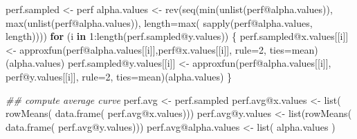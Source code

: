 \documentclass[
  letterpaper,
  DIV=11,
  numbers=noendperiod]{scrartcl}
\newenvironment{Shaded}{\begin{snugshade}}{\end{snugshade}}
\newcommand{\AttributeTok}[1]{\textcolor[rgb]{0.40,0.45,0.13}{#1}}
\newcommand{\ControlFlowTok}[1]{\textcolor[rgb]{0.00,0.23,0.31}{\textbf{#1}}}
\newcommand{\DecValTok}[1]{\textcolor[rgb]{0.68,0.00,0.00}{#1}}
\newcommand{\DocumentationTok}[1]{\textcolor[rgb]{0.37,0.37,0.37}{\textit{#1}}}
\newcommand{\FunctionTok}[1]{\textcolor[rgb]{0.28,0.35,0.67}{#1}}
\newcommand{\NormalTok}[1]{\textcolor[rgb]{0.00,0.23,0.31}{#1}}
\newcommand{\OtherTok}[1]{\textcolor[rgb]{0.00,0.23,0.31}{#1}}
\newcommand{\SpecialCharTok}[1]{\textcolor[rgb]{0.37,0.37,0.37}{#1}}
\begin{document}
\begin{Shaded}
\begin{Highlighting}[]
\NormalTok{    perf.sampled }\OtherTok{\textless{}{-}}\NormalTok{ perf}
\NormalTok{    alpha.values }\OtherTok{\textless{}{-}} \FunctionTok{rev}\NormalTok{(}\FunctionTok{seq}\NormalTok{(}\FunctionTok{min}\NormalTok{(}\FunctionTok{unlist}\NormalTok{(perf}\SpecialCharTok{@}\NormalTok{alpha.values)),}
                            \FunctionTok{max}\NormalTok{(}\FunctionTok{unlist}\NormalTok{(perf}\SpecialCharTok{@}\NormalTok{alpha.values)),}
                            \AttributeTok{length=}\FunctionTok{max}\NormalTok{( }\FunctionTok{sapply}\NormalTok{(perf}\SpecialCharTok{@}\NormalTok{alpha.values, length))))}
    \ControlFlowTok{for}\NormalTok{ (i }\ControlFlowTok{in} \DecValTok{1}\SpecialCharTok{:}\FunctionTok{length}\NormalTok{(perf.sampled}\SpecialCharTok{@}\NormalTok{y.values)) \{}
\NormalTok{        perf.sampled}\SpecialCharTok{@}\NormalTok{x.values[[i]] }\OtherTok{\textless{}{-}}
          \FunctionTok{approxfun}\NormalTok{(perf}\SpecialCharTok{@}\NormalTok{alpha.values[[i]],perf}\SpecialCharTok{@}\NormalTok{x.values[[i]],}
                    \AttributeTok{rule=}\DecValTok{2}\NormalTok{, }\AttributeTok{ties=}\NormalTok{mean)(alpha.values)}
\NormalTok{        perf.sampled}\SpecialCharTok{@}\NormalTok{y.values[[i]] }\OtherTok{\textless{}{-}}
          \FunctionTok{approxfun}\NormalTok{(perf}\SpecialCharTok{@}\NormalTok{alpha.values[[i]], perf}\SpecialCharTok{@}\NormalTok{y.values[[i]],}
                    \AttributeTok{rule=}\DecValTok{2}\NormalTok{, }\AttributeTok{ties=}\NormalTok{mean)(alpha.values)}
\NormalTok{    \}}

    \DocumentationTok{\#\# compute average curve}
\NormalTok{    perf.avg }\OtherTok{\textless{}{-}}\NormalTok{ perf.sampled}
\NormalTok{    perf.avg}\SpecialCharTok{@}\NormalTok{x.values }\OtherTok{\textless{}{-}} \FunctionTok{list}\NormalTok{( }\FunctionTok{rowMeans}\NormalTok{( }\FunctionTok{data.frame}\NormalTok{( perf.avg}\SpecialCharTok{@}\NormalTok{x.values)))}
\NormalTok{    perf.avg}\SpecialCharTok{@}\NormalTok{y.values }\OtherTok{\textless{}{-}} \FunctionTok{list}\NormalTok{(}\FunctionTok{rowMeans}\NormalTok{( }\FunctionTok{data.frame}\NormalTok{( perf.avg}\SpecialCharTok{@}\NormalTok{y.values)))}
\NormalTok{    perf.avg}\SpecialCharTok{@}\NormalTok{alpha.values }\OtherTok{\textless{}{-}} \FunctionTok{list}\NormalTok{( alpha.values )}
    

\end{Highlighting}
\end{Shaded}
\end{document}
